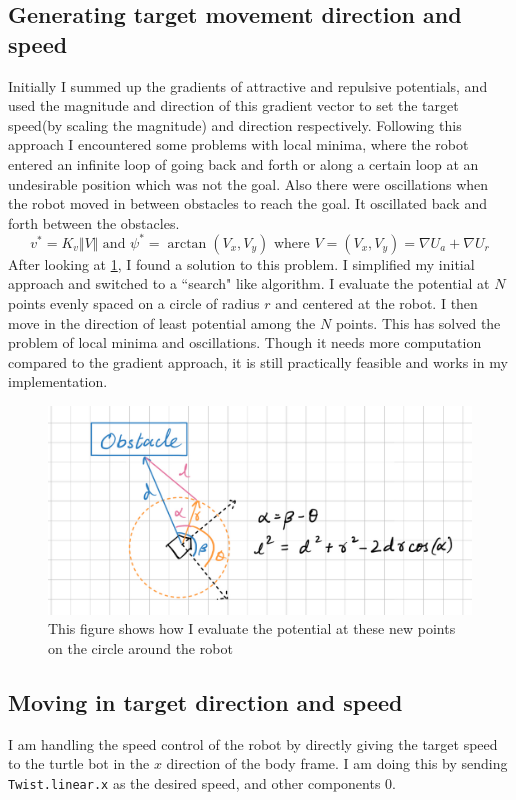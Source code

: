 \documentclass[11pt]{article}
\begin{document}
\subsection*{Generating target movement direction and speed}
Initially I summed up the gradients of attractive and repulsive potentials, and used the magnitude and direction of this gradient vector to 
set the target speed(by scaling the magnitude) and direction respectively. Following this approach I encountered some problems with local minima, where the robot entered an infinite loop of going back and forth or along a certain loop at an undesirable position which was not the goal. Also there were oscillations
when the robot moved in between obstacles to reach the goal. It oscillated back and forth between the obstacles. 
$$v^* = K_v \Vert V\Vert \text{ and } \psi^* = \arctan(V_x, V_y) \text{ where } V = (V_x, V_y) = \nabla U_a + \nabla U_r$$ 
After looking at \hyperref[foo]{1}, I found a solution to this problem. I simplified my initial approach and switched to a ``search" like algorithm. 
I evaluate the potential at $N$ points evenly spaced on a circle of radius $r$ and centered at the robot. I then move in the direction of least potential among the $N$ points. This has solved the problem of 
local minima and oscillations. Though it needs more computation compared to the gradient approach, it 
is still practically feasible and works in my implementation.
\begin{figure}[H]
    \begin{center}
        \includegraphics[width=0.6\linewidth]{images/Apf.png}
        \caption*{This figure shows how I evaluate the potential at these new points on the circle around the robot
        }
    \end{center}
\end{figure}
\subsection*{Moving in target direction and speed}
I am handling the speed control of the robot by directly giving the target speed to the turtle bot in the $x$ direction of the body frame. I am doing this 
by sending \texttt{Twist.linear.x} as the desired speed, and other components 0.
\end{document}
